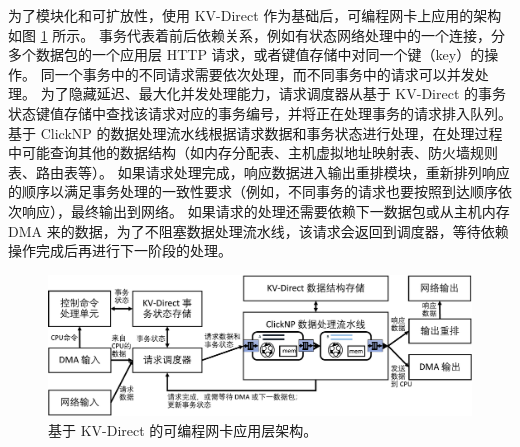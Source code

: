 为了模块化和可扩放性，使用 KV-Direct 作为基础后，可编程网卡上应用的架构如图 \ref{arch:fig:kvdirect_arch} 所示。
事务代表着前后依赖关系，例如有状态网络处理中的一个连接，分多个数据包的一个应用层 HTTP 请求，或者键值存储中对同一个键（key）的操作。
同一个事务中的不同请求需要依次处理，而不同事务中的请求可以并发处理。
为了隐藏延迟、最大化并发处理能力，请求调度器从基于 KV-Direct 的事务状态键值存储中查找该请求对应的事务编号，并将正在处理事务的请求排入队列。
基于 ClickNP 的数据处理流水线根据请求数据和事务状态进行处理，在处理过程中可能查询其他的数据结构（如内存分配表、主机虚拟地址映射表、防火墙规则表、路由表等）。
如果请求处理完成，响应数据进入输出重排模块，重新排列响应的顺序以满足事务处理的一致性要求（例如，不同事务的请求也要按照到达顺序依次响应），最终输出到网络。
如果请求的处理还需要依赖下一数据包或从主机内存 DMA 来的数据，为了不阻塞数据处理流水线，该请求会返回到调度器，等待依赖操作完成后再进行下一阶段的处理。


\begin{figure}[htbp]
	\centering
	\includegraphics[width=1.0\textwidth]{../figures/kvdirect_arch.pdf}
	\caption{基于 KV-Direct 的可编程网卡应用层架构。}
	\label{arch:fig:kvdirect_arch}
\end{figure}
